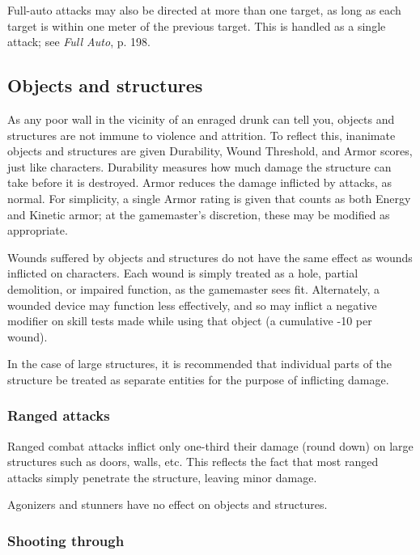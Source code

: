 Full-auto attacks may also be directed at more than one target, as long as each target is within one meter of the previous target. This is handled as a single attack; see \emph{Full Auto}, p. 198. 



\subsection{Objects and structures} \label{sec:objects-structures} 

As any poor wall in the vicinity of an enraged drunk can tell you, objects and structures are not immune to violence and attrition. To reflect this, inanimate objects and structures are given Durability, Wound Threshold, and Armor scores, just like characters. Durability measures how much damage the structure can take before it is destroyed. Armor reduces the damage inflicted by attacks, as normal. For simplicity, a single Armor rating is given that counts as both Energy and Kinetic armor; at the gamemaster’s discretion, these may be modified as appropriate. 

Wounds suffered by objects and structures do not have the same effect as wounds inflicted on characters. Each wound is simply treated as a hole, partial demolition, or impaired function, as the gamemaster sees fit. Alternately, a wounded device may function less effectively, and so may inflict a negative modifier on skill tests made while using that object (a cumulative -10 per wound). 

In the case of large structures, it is recommended that individual parts of the structure be treated as separate entities for the purpose of inflicting damage. 

\subsubsection{Ranged attacks} 

Ranged combat attacks inflict only one-third their damage (round down) on large structures such as doors, walls, etc. This reflects the fact that most ranged attacks simply penetrate the structure, leaving minor damage. 

Agonizers and stunners have no effect on objects and structures. 

\subsubsection{Shooting through} 

